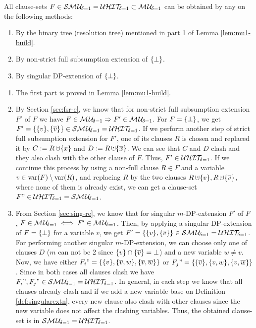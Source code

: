\documentclass{article}
\begin{document}
\begin{lem}\label{lem:smu1-uhit1}
All clause-sets $F \in  \mathcal{S}\mathcal{M\hspace{0.8pt}U}_{\!\delta=1} = \mathcal{U}\mathcal{HIT}_{\!\!\delta=1} \subset \mathcal{M\hspace{0.8pt}U}_{\!\delta=1}$ can be obtained by any on the following methods:
  \begin{enumerate}
  \item By the binary tree (resolution tree) mentioned in part 1 of Lemma \ref{lem:mu1-build}.
  \item By non-strict full subsumption extension of $\{ \bot \}$.
  \item By singular DP-extension of $\{ \bot \}$.
  \end{enumerate} 
\end{lem}
\begin{prf}
  \begin{enumerate}
  \item The first part is proved in Lemma \ref{lem:mu1-build}.          
  \item By Section \ref{sec:fsr-e}, we know that for non-strict full subsumption extension $F'$ of $F$ we have $F \in  \mathcal{M\hspace{0.8pt}U}_{\!\delta=1} \Rightarrow F' \in \mathcal{M\hspace{0.8pt}U}_{\!\delta=1}$. For  $F=\{ \bot \}$, we get $F'=\{ \{ v \},\{ \overline v \} \} \in \mathcal{S}\mathcal{M\hspace{0.8pt}U}_{\!\delta=1} = \mathcal{U}\mathcal{HIT}_{\!\!\delta=1}$. If we perform another step of strict full subsumption extension for $F'$, one of its clauses $R$ is chosen and replaced it by $C := R \addcup \set{x}$ and $D := R \addcup \set{\ol{x}}$. We can see that $C$ and $D$ clash and  they also clash with the other clause of $F$. Thus, $F' \in \mathcal{U}\mathcal{HIT}_{\!\!\delta=1}$. If we continue this process by using a non-full clause $R \in F$ and a variable $v \in \operatorname{var}(F) \setminus \operatorname{var}(R)$, and replacing $R$ by the two clauses $R \addcup \set{v}, R \addcup \set{\ol{v}}$, where none of them is already exist, we can get a clause-set $F" \in \mathcal{U}\mathcal{HIT}_{\!\!\delta=1}=\mathcal{S}\mathcal{M\hspace{0.8pt}U}_{\!\delta=1}$.    
  \item From Section \ref{sec:sing-re}, we know that for singular $m$-DP-extension $F'$ of $F$ , $F \in \mathcal{M\hspace{0.8pt}U}_{\!\delta=1} \iff F' \in \mathcal{M\hspace{0.8pt}U}_{\!\delta=1}$. Then, by applying a singular DP-extension of $F=\{ \bot \}$ for a variable $v$, we get $F'=\{ \{ v \},\{ \overline v \} \} \in \mathcal{S}\mathcal{M\hspace{0.8pt}U}_{\!\delta=1} = \mathcal{U}\mathcal{HIT}_{\!\!\delta=1}$. For performing another  singular $m$-DP-extension, we can choose only one of clauses $D$ ($m$ can not be 2 since $\{ v \} \cap \{ \overline v \}=\bot $) and a new variable $w \not = v$. Now, we have either $F_i"=\{ \{ v \},\{ \overline v, w \},\{ \overline v,\overline w \} \}$ or $F_j"=\{ \{ \overline v \},\{  v, w \},\{  v,\overline w \} \}$. Since in both cases all clauses clash we have $F_i",F_j" \in \mathcal{S}\mathcal{M\hspace{0.8pt}U}_{\!\delta=1} = \mathcal{U}\mathcal{HIT}_{\!\!\delta=1}$. In general, in each step we know that all clauses already clash and if we add a new variable base on Definition \ref{def:singularextn}, every new clause also clash with other clauses since the new variable does not affect the clashing variables. Thus, the obtained clause-set is in $\mathcal{S}\mathcal{M\hspace{0.8pt}U}_{\!\delta=1} = \mathcal{U}\mathcal{HIT}_{\!\!\delta=1}$.
  \end{enumerate}
\end{prf}
\end{document}
